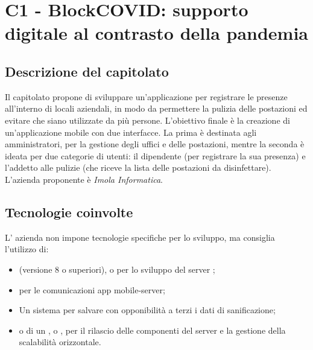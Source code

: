 \section{C1 - BlockCOVID: supporto digitale al contrasto della pandemia}
\subsection{Descrizione del capitolato}
Il capitolato propone di sviluppare un'applicazione per registrare le presenze all'interno di locali aziendali, in modo da permettere la pulizia delle postazioni ed evitare che siano utilizzate da più persone.
L'obiettivo finale è la creazione di un'applicazione mobile con due interfacce. La prima è destinata agli amministratori, per la gestione degli uffici e delle postazioni, mentre la seconda è ideata per due categorie di utenti: il dipendente (per registrare la sua presenza) e l'addetto alle pulizie (che riceve la lista delle postazioni da disinfettare).\\
L'azienda proponente è \textit{Imola Informatica}.

\subsection{Tecnologie coinvolte}
L' azienda non impone tecnologie specifiche per lo sviluppo, ma consiglia l'utilizzo di:
\begin{itemize}
\item {} (versione 8 o superiori),  o  per lo sviluppo del server ;
\item {} per le comunicazioni app mobile-server;
\item Un sistema  per salvare con opponibilità a terzi i dati di sanificazione;
\item {} o di un ,  o , per il rilascio delle componenti del server e la gestione della scalabilità orizzontale.
\end{itemize}

